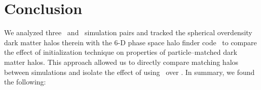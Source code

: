 
%
%

\section{Conclusion}
\label{sec:2lpt--conclusion}



We analyzed three \lpt\ and \za\ simulation pairs and tracked the spherical overdensity dark matter halos therein with the 6-D phase space halo finder code \rockstar\ to compare the effect of initialization technique on properties of particle--matched dark matter halos.  This approach allowed us to directly compare matching halos between simulations and isolate the effect of using \lpt\ over \za.  In summary, we found the following:

